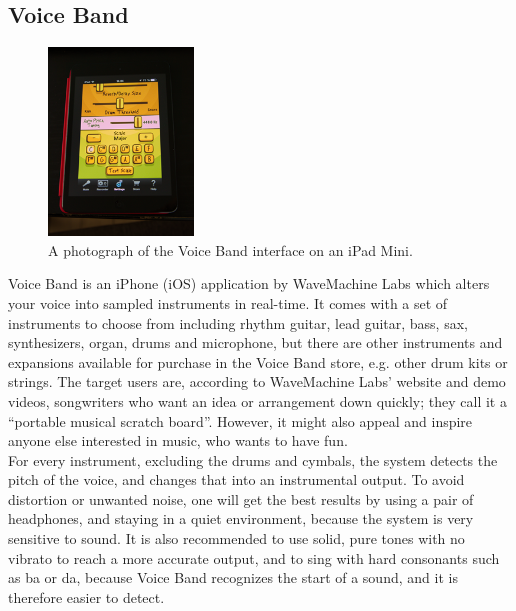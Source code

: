 \subsection{ Voice Band }
\begin{figure}[h]
	\begin{center}
		\includegraphics[height=5cm]{fig/voiceband.png}
		\caption{A photograph of the Voice Band interface on an iPad Mini.}
		\label{VoiceBand}
	\end{center}
\end{figure}

Voice Band is an iPhone (iOS) application by WaveMachine Labs which alters your voice into sampled instruments in real-time. It comes with a set of instruments to choose from including rhythm guitar, lead guitar, bass, sax, synthesizers, organ, drums and microphone, but there are other instruments and expansions available for purchase in the Voice Band store, e.g. other drum kits or strings. The target users are, according to WaveMachine Labs’ website and demo videos, songwriters who want an idea or arrangement down quickly; they call it a “portable musical scratch board”. However, it might also appeal and inspire anyone else interested in music, who wants to have fun. \\

For every instrument, excluding the drums and cymbals, the system detects the pitch of the voice, and changes that into an instrumental output. To avoid distortion or unwanted noise, one will get the best results by using a pair of headphones, and staying in a quiet environment, because the system is very sensitive to sound. It is also recommended to use solid, pure tones with no vibrato to reach a more accurate output, and to sing with hard consonants such as ba or da, because Voice Band recognizes the start of a sound, and it is therefore easier to detect.  \\

